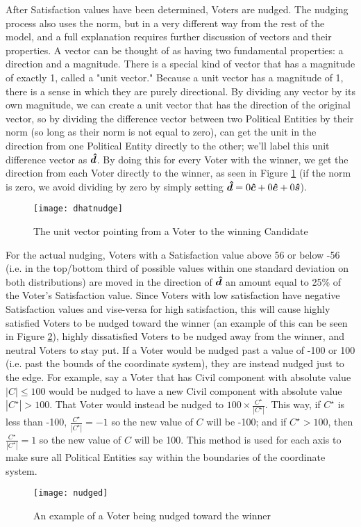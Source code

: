 \documentclass[12pt]{article}
\newcommand{\civ}{\vhat{c}}
\newcommand{\econ}{\vhat{e}}
\newcommand{\soc}{\vhat{s}}
\begin{document}
\qquad After Satisfaction values have been determined, Voters are nudged. The nudging process also uses the norm, but in a very different way from the rest of the model, and a full explanation requires further discussion of vectors and their properties. A vector can be thought of as having two fundamental properties: a direction and a magnitude. There is a special kind of vector that has a magnitude of exactly 1, called a "unit vector." Because a unit vector has a magnitude of 1, there is a sense in which they are purely directional. By dividing any vector by its own magnitude, we can create a unit vector that has the direction of the original vector, so by dividing the difference vector between two Political Entities by their norm (so long as their norm is not equal to zero), can get the unit in the direction from one Political Entity directly to the other; we'll label this unit difference vector as $\bm{\hat{d}}$. By doing this for every Voter with the winner, we get the direction from each Voter directly to the winner, as seen in Figure \ref{exUnitVectors} (if the norm is zero, we avoid dividing by zero by simply setting $\vhat{d} = 0\civ + 0\econ + 0\soc$).
\begin{figure}[H]
\centering
\texttt{[image: dhatnudge]}
\caption{\footnotesize The unit vector pointing from a Voter to the winning Candidate}
\label{exUnitVectors}
\end{figure}

\qquad For the actual nudging, Voters with a Satisfaction value above 56 or below -56 (i.e. in the top/bottom third of possible values within one standard deviation on both distributions) are moved in the direction of $\bm{\hat{d}}$ an amount equal to 25\% of the Voter's Satisfaction value. Since Voters with low satisfaction have negative Satisfaction values and vise-versa for high satisfaction, this will cause highly satisfied Voters to be nudged toward the winner (an example of this can be seen in Figure \ref{exNudge}), highly dissatisfied Voters to be nudged away from the winner, and neutral Voters to stay put. If a Voter would be nudged past a value of -100 or 100 (i.e. past the bounds of the coordinate system), they are instead nudged just to the edge. For example, say a Voter that has Civil component with absolute value $\left|C\right| \le 100$ would be nudged to have a new Civil component with absolute value $\left|C^\star\right| > 100$. That Voter would instead be nudged to $100 \times \frac{C^\star}{\left|C^\star\right|}$. This way, if $C^\star$ is less than -100, $\frac{C^\star}{\left|C^\star\right|} = -1$ so the new value of $C$ will be -100; and if $C^\star > 100$, then $\frac{C^\star}{\left|C^\star\right|} = 1$ so the new value of $C$ will be 100. This method is used for each axis to make sure all Political Entities say within the boundaries of the coordinate system.
\begin{figure}[H]
\centering
\texttt{[image: nudged]}
\caption{\footnotesize An example of a Voter being nudged toward the winner}
\label{exNudge}
\end{figure}
\end{document}
